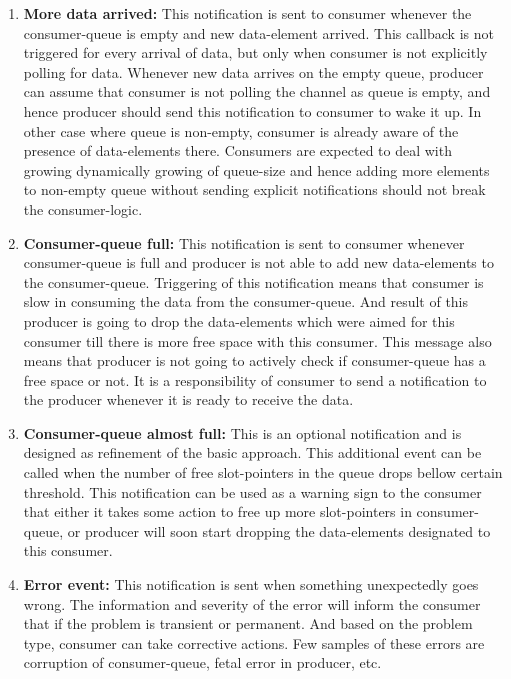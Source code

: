 \documentclass[a4paper,twoside]{report} %
\begin{document}
\begin{enumerate} 
  \item \textbf{More data arrived:} This notification is sent to
  consumer whenever the consumer-queue is empty and new data-element 
  arrived.  This callback is not triggered for every arrival of data,
  but only when consumer is not explicitly polling for data.  Whenever
  new data arrives on the empty queue, producer can assume that
  consumer is not polling the channel as queue is empty, and hence
  producer should send this notification to consumer to wake it up.
  In other case where queue is non-empty, consumer is already aware of
  the presence of data-elements there.  Consumers are expected to
  deal with growing dynamically growing of queue-size and hence adding
  more elements to non-empty queue without sending explicit
  notifications should not break the consumer-logic.

  \item \textbf{Consumer-queue full:}  This notification is sent to
  consumer whenever consumer-queue is full and producer is not able 
  to add new data-elements to the consumer-queue.  Triggering of this
  notification means that consumer is slow in consuming the data from 
  the consumer-queue. And result of this producer is going to drop 
  the data-elements which were aimed for this consumer till there 
  is more free space with this consumer.  This message also means that
  producer is not going to actively check if consumer-queue has a free
  space or not.  It is a responsibility of consumer to send
  a notification to the producer whenever it is ready to receive the
  data.
 
  \item \textbf{Consumer-queue almost full:} This is an optional
  notification and is designed as refinement of the basic approach.
  This additional event can be 
  called when the number of free slot-pointers in the queue drops bellow
  certain threshold.  This notification can be used as a warning sign
  to the consumer that either it takes some action to free up more
  slot-pointers in consumer-queue, or producer will soon start dropping the
  data-elements designated to this consumer.

  \item \textbf{Error event:}  This notification is sent when something
  unexpectedly goes wrong.  The information and severity of the error
  will inform the consumer that if the problem is transient or
  permanent.  And based on the problem type, consumer can take
  corrective actions.  Few samples of these errors are corruption of
  consumer-queue, fetal error in producer, etc.


\end{enumerate}
\end{document}
